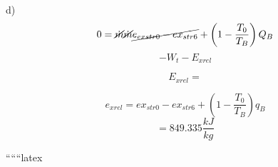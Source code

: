 d)
\[
0 = \cancel{\dot{m}} \cancel{\dot{m}} \cancel{e_{exstr0} - ex_{str6}} + \left( 1 - \frac{T_0}{T_B} \right) Q_B
\]
\[
- W_t - E_{xrel}
\]

\[
E_{xrel} = 
\]

\[
e_{xrel} = ex_{str0} - ex_{str6} + \left( 1 - \frac{T_0}{T_B} \right) q_B
\]
\[
= 849.335 \frac{kJ}{kg}
\]

``````latex